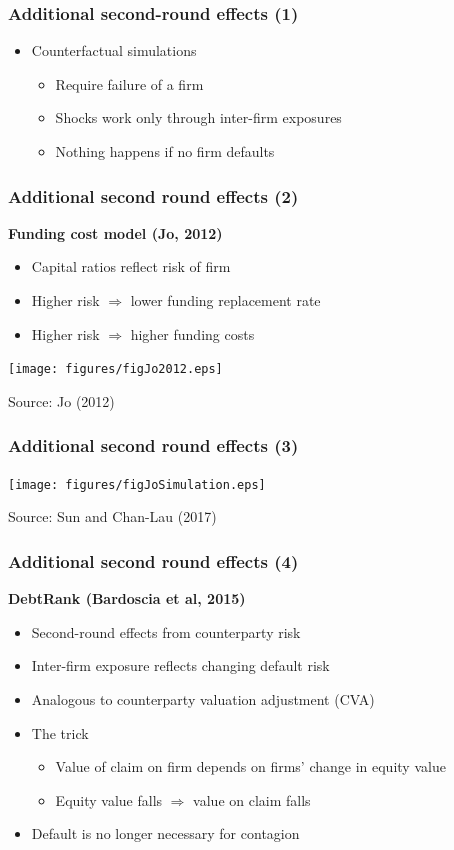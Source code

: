\documentclass[aspectratio=43,dvipsnames,usenames, svgnames]{beamer}
\begin{document}
\begin{frame} %
\frametitle{Additional second-round effects (1)}
\begin{itemize}
	\item Counterfactual simulations
	\begin{itemize}
		\item Require failure of a firm
		\item Shocks work only through inter-firm exposures
		\item Nothing happens if no firm defaults
	\end{itemize}
	\smallskip
\end{itemize}
\end{frame}

\begin{frame} %
\frametitle{Additional second round effects (2)}
\textbf{Funding cost model (Jo, 2012)}
\begin{itemize}
	\item Capital ratios reflect risk of firm
	\item Higher risk $\Rightarrow$ lower funding replacement rate
	\item Higher risk $\Rightarrow$ higher funding costs
\end{itemize}
\begin{center}
	\texttt{[image: figures/figJo2012.eps]}
\end{center}
\tiny{Source: Jo (2012)}
\end{frame}

\begin{frame} %
\frametitle{Additional second round effects (3)}
\begin{center}
	\texttt{[image: figures/figJoSimulation.eps]}
\end{center}
\tiny{Source: Sun and Chan-Lau (2017)}
\end{frame}

\begin{frame} %
\frametitle{Additional second round effects (4)}
\textbf{DebtRank (Bardoscia et al, 2015)}
\vspace{4mm}
\begin{itemize}
	\item Second-round effects from counterparty risk
	\smallskip
	\item Inter-firm exposure reflects changing default risk
	\smallskip
	\item Analogous to counterparty valuation adjustment (CVA)
	\smallskip
	\item The trick
	\begin{itemize}
		\item Value of claim on firm depends on firms' change in equity value
		\item Equity value falls $\Rightarrow$ value on claim falls
	\end{itemize}
	\smallskip
	\item Default is no longer necessary for contagion
\end{itemize}
\end{frame}
\end{document}
